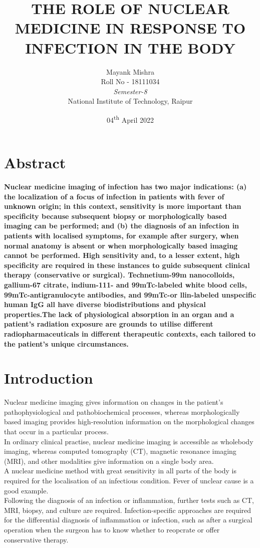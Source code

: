 \documentclass[12pt]{article}
\title{\textbf{THE ROLE OF NUCLEAR MEDICINE IN RESPONSE TO INFECTION IN THE BODY}}
\author{Mayank Mishra\\ Roll No - 18111034 \\ \textit{Semester-8} \\ National Institute of Technology, Raipur }
\date{04\textsuperscript{th} April 2022}
\begin{document}
\maketitle

\section*{Abstract}
\textbf{ Nuclear medicine imaging of infection has two major indications: (a) the localization of a focus of infection in patients with fever of unknown origin; in this context, sensitivity is more important than specificity because subsequent biopsy or morphologically based imaging can be performed; and (b) the diagnosis of an infection in patients with localised symptoms, for example after surgery, when normal anatomy is absent or when morphologically based imaging cannot be performed. High sensitivity and, to a lesser extent, high specificity are required in these instances to guide subsequent clinical therapy (conservative or surgical). Technetium-99m nanocolloids, gallium-67 citrate, indium-111- and 99mTc-labeled white blood cells, 99mTc-antigranulocyte antibodies, and 99mTc-or llin-labeled unspecific human IgG all have diverse biodistributions and physical properties.The lack of physiological absorption in an organ and a patient's radiation exposure are grounds to utilise different radiopharmaceuticals in different therapeutic contexts, each tailored to the patient's unique circumstances.}




\section*{Introduction}
 Nuclear medicine imaging gives information on changes in the patient's pathophysiological and pathobiochemical processes, whereas morphologically based imaging provides high-resolution information on the morphological changes that occur in a particular process.
\\In ordinary clinical practise, nuclear medicine imaging is accessible as wholebody imaging, whereas computed tomography (CT), magnetic resonance imaging (MRI), and other modalities give information on a single body area.
\\A nuclear medicine method with great sensitivity in all parts of the body is required for the localisation of an infectious condition. Fever of unclear cause is a good example.
\\Following the diagnosis of an infection or inflammation, further tests such as CT, MRI, biopsy, and culture are required. Infection-specific approaches are required for the differential diagnosis of inflammation or infection, such as after a surgical operation when the surgeon has to know whether to reopcrate or offer conservative therapy.
\end{document}
